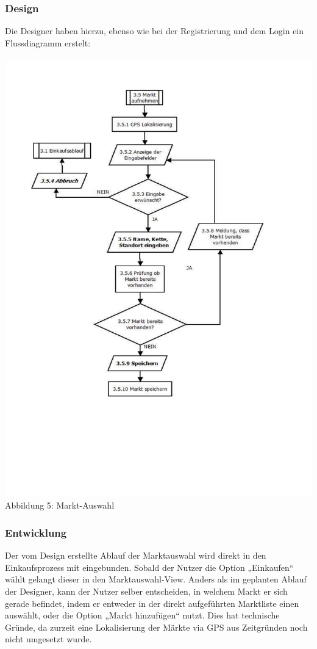 \documentclass[12pt,a4paper]{article}
\begin{document}
\subsubsection*{Design}
Die Designer haben hierzu, ebenso wie bei der Registrierung und dem Login ein Flussdiagramm erstelt: 
\\
\\
\hspace*{-10mm} 
\includegraphics[trim = 17mm 40mm 0mm 20mm, clip, scale=0.9]{Markt-Aufnahme.pdf}
\\
\footnotesize Abbildung 5: Markt-Auswahl
\normalsize
\subsubsection*{Entwicklung}
Der vom Design erstellte Ablauf der Marktauswahl wird direkt in den Einkaufsprozess mit eingebunden. Sobald der Nutzer die Option „Einkaufen“ wählt gelangt dieser in den Marktauswahl-View. Anders als im geplanten Ablauf der Designer, kann der Nutzer selber entscheiden, in welchem Markt er sich gerade befindet, indem er entweder in der direkt aufgeführten Marktliste einen auswählt, oder die Option „Markt hinzufügen“ nutzt. Dies hat technische Gründe, da zurzeit eine Lokalisierung der Märkte via GPS aus Zeitgründen noch nicht umgesetzt wurde.
\newpage
\end{document}
